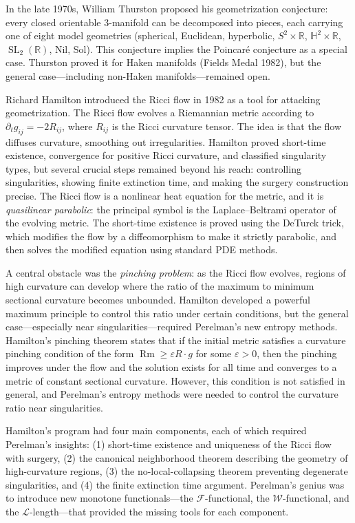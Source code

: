 In the late 1970s, William Thurston proposed his geometrization conjecture: every closed orientable 3-manifold can be decomposed into pieces, each carrying one of eight model geometries (spherical, Euclidean, hyperbolic, $S^2 \times \mathbb{R}$, $\mathbb{H}^2 \times \mathbb{R}$, $\operatorname{SL}_2(\mathbb{R})$, Nil, Sol). This conjecture implies the Poincar\'e conjecture as a special case. Thurston proved it for Haken manifolds (Fields Medal 1982), but the general case---including non-Haken manifolds---remained open.

Richard Hamilton introduced the Ricci flow in 1982 as a tool for attacking geometrization. The Ricci flow evolves a Riemannian metric according to $\partial_t g_{ij} = -2R_{ij}$, where $R_{ij}$ is the Ricci curvature tensor. The idea is that the flow diffuses curvature, smoothing out irregularities. Hamilton proved short-time existence, convergence for positive Ricci curvature, and classified singularity types, but several crucial steps remained beyond his reach: controlling singularities, showing finite extinction time, and making the surgery construction precise. The Ricci flow is a nonlinear heat equation for the metric, and it is \emph{quasilinear parabolic}: the principal symbol is the Laplace--Beltrami operator of the evolving metric. The short-time existence is proved using the DeTurck trick, which modifies the flow by a diffeomorphism to make it strictly parabolic, and then solves the modified equation using standard PDE methods.

A central obstacle was the \emph{pinching problem}: as the Ricci flow evolves, regions of high curvature can develop where the ratio of the maximum to minimum sectional curvature becomes unbounded. Hamilton developed a powerful maximum principle to control this ratio under certain conditions, but the general case---especially near singularities---required Perelman's new entropy methods. Hamilton's pinching theorem states that if the initial metric satisfies a curvature pinching condition of the form $\operatorname{Rm} \ge \varepsilon R \cdot g$ for some $\varepsilon > 0$, then the pinching improves under the flow and the solution exists for all time and converges to a metric of constant sectional curvature. However, this condition is not satisfied in general, and Perelman's entropy methods were needed to control the curvature ratio near singularities.

Hamilton's program had four main components, each of which required Perelman's insights: (1) short-time existence and uniqueness of the Ricci flow with surgery, (2) the canonical neighborhood theorem describing the geometry of high-curvature regions, (3) the no-local-collapsing theorem preventing degenerate singularities, and (4) the finite extinction time argument. Perelman's genius was to introduce new monotone functionals---the $\mathcal{F}$-functional, the $\mathcal{W}$-functional, and the $\mathcal{L}$-length---that provided the missing tools for each component.

